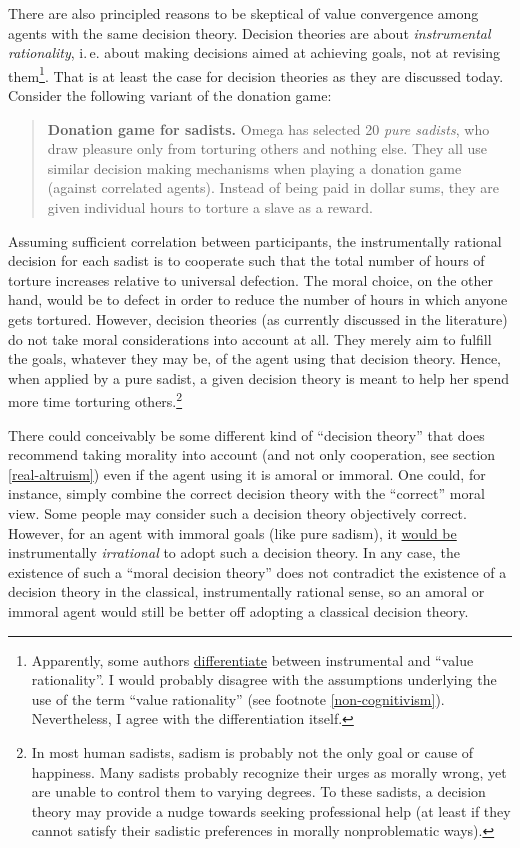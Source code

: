 There are also principled reasons to be skeptical of value convergence
among agents with the same decision theory. Decision theories are about
\emph{instrumental rationality}, i.\,e. about making decisions aimed at
achieving goals, not at revising them\footnote{Apparently, some authors
  \href{https://en.wikipedia.org/wiki/Instrumental_and_value_rationality}{differentiate}
  between instrumental and ``value rationality''. I would probably
  disagree with the assumptions underlying the use of the term ``value
  rationality'' (see footnote \ref{non-cognitivism}).
  Nevertheless, I agree with the differentiation itself.}. That is at
least the case for decision theories as they are discussed today.
Consider the following variant of the donation game:

\begin{quote}
\textbf{Donation game for sadists.} Omega has selected 20 \emph{pure
sadists}, who draw pleasure only from torturing others and nothing else.
They all use similar decision making mechanisms when playing a donation
game (against correlated agents). Instead of being paid in dollar sums,
they are given individual hours to torture a slave as a reward.
\end{quote}

Assuming sufficient correlation between participants, the instrumentally
rational decision for each sadist is to cooperate such that the total
number of hours of torture increases relative to universal defection.
The moral choice, on the other hand, would be to defect in order to
reduce the number of hours in which anyone gets tortured. However,
decision theories (as currently discussed in the literature) do not take
moral considerations into account at all. They merely aim to fulfill the
goals, whatever they may be, of the agent using that decision theory.
Hence, when applied by a pure sadist, a given decision theory is meant
to help her spend more time torturing others.\footnote{In most human
  sadists, sadism is probably not the only goal or cause of happiness.
  Many sadists probably recognize their urges as morally wrong, yet are
  unable to control them to varying degrees. To these sadists, a
  decision theory may provide a nudge towards seeking professional help
  (at least if they cannot satisfy their sadistic preferences in morally
  nonproblematic ways).}

There could conceivably be some different kind of ``decision theory''
that does recommend taking morality into account (and not only
cooperation, see section \ref{real-altruism}) even if the agent using it is amoral or immoral. One
could, for instance, simply combine the correct decision theory with the
``correct'' moral view. Some people may consider such a decision theory
objectively correct. However, for an agent with immoral goals (like pure
sadism), it
\href{http://reducing-suffering.org/thoughts-on-postmodernism-and-its-intellectual-kin/\#Why_care_about_ethics}{would
be} instrumentally \emph{irrational} to adopt such a decision theory.
In any case, the existence of such a ``moral decision theory'' does not
contradict the existence of a decision theory in the classical,
instrumentally rational sense, so an amoral or immoral agent would still
be better off adopting a classical decision theory.

